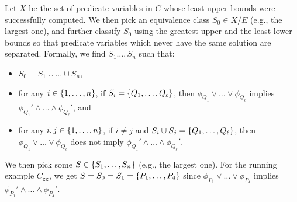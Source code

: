Let \(X\) be the set of predicate variables in \(C\) whose least upper 
bounds were successfully computed.  We then pick an equivalence class 
\(S_0 \in X / E\) (e.g., the largest one), and further classify \(S_0\) 
using the greatest upper and the least lower bounds so that predicate 
variables which never have the same solution are separated.
%
Formally, we find \(S_1\dots,S_n\) such that:
\begin{itemize}
\item \(S_0 = S_1 \cup \dots \cup S_n\),
\item for any \(i \in \{{1,\dots,n}\}\), if \(S_i 
=\{{Q_1,\dots,Q_{\ell}}\}\), then \(\phi_{Q_1} \lor \dots \lor 
\phi_{Q_{\ell}}\) implies \(\phi_{Q_1}' \land \dots \land 
\phi_{Q_{\ell}}'\), and \item for any \(i,j \in \{{1,\dots,n}\}\), if 
\(i \neq j\) and \(S_i \cup S_j = \{{Q_1,\dots,Q_{\ell}}\}\), then 
\(\phi_{Q_1} \lor \dots \lor \phi_{Q_{\ell}}\) does not imply 
\(\phi_{Q_1}' \land \dots \land \phi_{Q_{\ell}}'\).
\end{itemize}
We then pick some \(S \in \{{S_1,\dots,S_n}\}\) (e.g., the largest one).
%
For the running example \(C_{\texttt{cc}}\), we get 
\(S=S_0=S_1=\{{P_1,\dots,P_4}\}\) since \(\phi_{P_1} \lor \dots 
\lor\phi_{P_4}\) implies \(\phi_{P_1}' \land \dots \land \phi_{P_4}'\).

